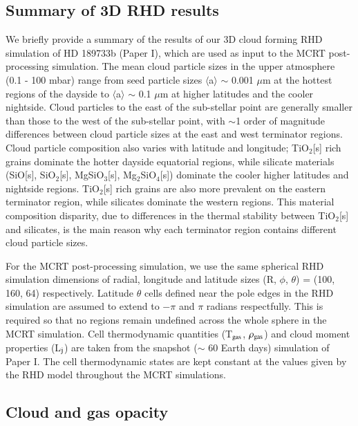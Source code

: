 \documentclass{aa}
\begin{document}
\subsection{Summary of 3D RHD results}
We briefly provide a summary of the results of our 3D cloud forming RHD simulation of HD 189733b (Paper I), which are used as input to the MCRT post-processing simulation.
The mean cloud particle sizes in the upper atmosphere (0.1 - 100 mbar) range from seed particle sizes $\langle$a$\rangle$ $\sim$ 0.001 $\mu$m at the hottest regions of the dayside to  $\langle$a$\rangle$ $\sim$ 0.1 $\mu$m at higher latitudes and the cooler nightside.
Cloud particles to the east of the sub-stellar point are generally smaller than those to the west of the sub-stellar point, with $\sim$1 order of magnitude differences between cloud particle sizes at the east and west terminator regions.
Cloud particle composition also varies with latitude and longitude; TiO$_{2}$[s] rich grains dominate the hotter dayside equatorial regions, while silicate materials (SiO[s], SiO$_{2}$[s], MgSiO$_{3}$[s], Mg$_{2}$SiO$_{4}$[s]) dominate the cooler higher latitudes and nightside regions.
TiO$_{2}$[s] rich grains are also more prevalent on the eastern terminator region, while silicates dominate the western regions. 
This material composition disparity, due to differences in the thermal stability between TiO$_{2}$[s] and silicates, is the main reason why each terminator region contains different cloud particle sizes.

For the MCRT post-processing simulation, we use the same spherical RHD simulation dimensions of radial, longitude and latitude sizes  (R, $\phi$, $\theta$)  = (100, 160, 64) respectively.
Latitude $\theta$ cells defined near the pole edges in the RHD simulation are assumed to extend to $-\pi$ and $\pi$ radians respectfully.
This is required so that no regions remain undefined across the whole sphere in the MCRT simulation.
Cell thermodynamic quantities (T$_{\rm gas}$, $\rho_{\rm gas}$) and cloud moment properties (L$_{\rm j}$) are taken from the snapshot ($\sim$ 60 Earth days) simulation of Paper I.
The cell thermodynamic states are kept constant at the values given by the RHD model throughout the MCRT simulations.

\subsection{Cloud and gas opacity}
\label{sec:gdopac}
\end{document}
